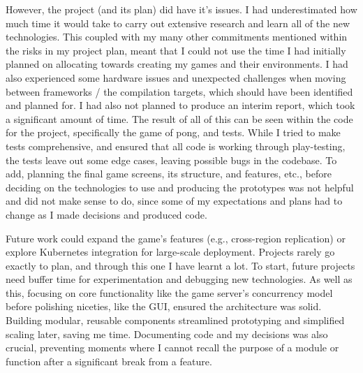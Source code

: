 \documentclass[]{final}
\begin{document}
However, the project (and its plan) did have it's issues.
I had underestimated how much time it would
take to carry out extensive research and learn all of the new technologies. This
coupled with my many other commitments mentioned within the risks in my project plan,
meant that I could not use the time I had initially planned on allocating towards
creating my games and their environments. I had also experienced some hardware
issues and unexpected challenges when moving between frameworks / the compilation
targets, which should have been identified and planned for. I had also not planned to
produce an interim report, which took a significant amount of time.
The result of all of this can be seen within the
code for the project, specifically the game of pong, and tests. While I tried to make tests comprehensive,
and ensured that all code is working through play-testing, the tests leave out
some edge cases, leaving possible bugs in the codebase.
To add, planning the final game screens, its structure, and features, etc., before
deciding on the technologies to use and producing the prototypes was not helpful and
did not make sense to do, since some of my expectations and plans had to change as I
made decisions and produced code.

Future work could expand the game’s features (e.g., cross-region replication) or
explore Kubernetes integration for large-scale deployment.
Projects rarely go exactly to plan, and through this one I have learnt a lot.
To start, future projects need buffer time for experimentation and debugging new
technologies. As well as this, focusing on core functionality like the game
server’s concurrency model before polishing niceties, like the GUI, ensured the
architecture was solid. Building modular, reusable components streamlined
prototyping and simplified scaling later, saving me time.
Documenting code and my decisions was also crucial, preventing moments
where I cannot recall the purpose of a module or function after a significant
break from a feature.

\newpage
{}




\end{document}
